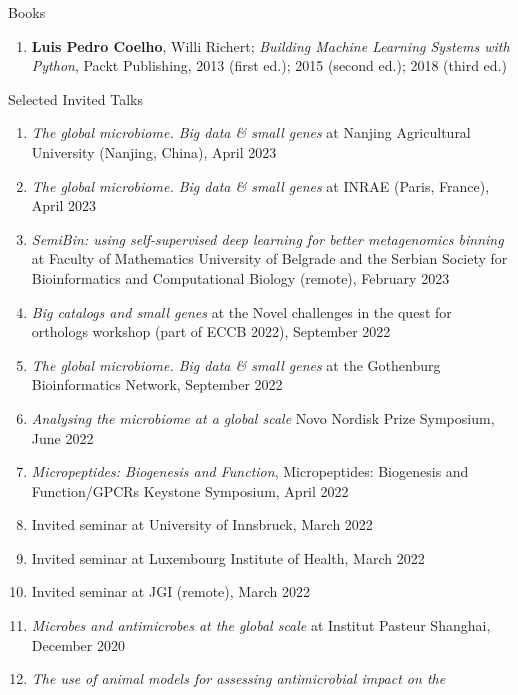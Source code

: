 \documentclass{article}
\renewcommand\subsection[1]{%
    \par\vspace{.1em}%
    {\hspace{0em}\subsubhead #1}%
    \par\vspace{.4em}%
}
\begin{document}
\subsection{Books}
\begin{enumerate}
\item \textbf{Luis Pedro Coelho}, Willi Richert; \emph{Building Machine
Learning Systems with Python}, Packt Publishing, 2013 (first ed.); 2015
(second ed.); 2018 (third ed.)
\end{enumerate}

\break
\subsection{Selected Invited Talks}
\begin{enumerate}
\item \emph{The global microbiome. Big data \& small genes} at Nanjing Agricultural University (Nanjing, China), April 2023
\item \emph{The global microbiome. Big data \& small genes} at INRAE (Paris, France), April 2023
\item \emph{SemiBin: using self-supervised deep learning for better metagenomics binning} at Faculty of Mathematics University of Belgrade and the Serbian Society for Bioinformatics and Computational Biology (remote), February 2023
\item \emph{Big catalogs and small genes} at the Novel challenges in the
    quest for orthologs workshop (part of ECCB 2022), September 2022
\item \emph{The global microbiome. Big data \& small genes} at the Gothenburg
    Bioinformatics Network, September 2022
\item \emph{Analysing the microbiome at a global scale} Novo Nordisk Prize
    Symposium, June 2022
\item \emph{Micropeptides: Biogenesis and Function}, Micropeptides:
    Biogenesis and Function/GPCRs Keystone Symposium, April 2022
\item Invited seminar at University of Innsbruck, March 2022
\item Invited seminar at Luxembourg Institute of Health, March 2022
\item Invited seminar at JGI (remote), March 2022
\item \emph{Microbes and antimicrobes at the global scale} at Institut Pasteur
    Shanghai, December 2020
\item \emph{The use of animal models for assessing antimicrobial impact on the
}
\end{enumerate}
\end{document}
